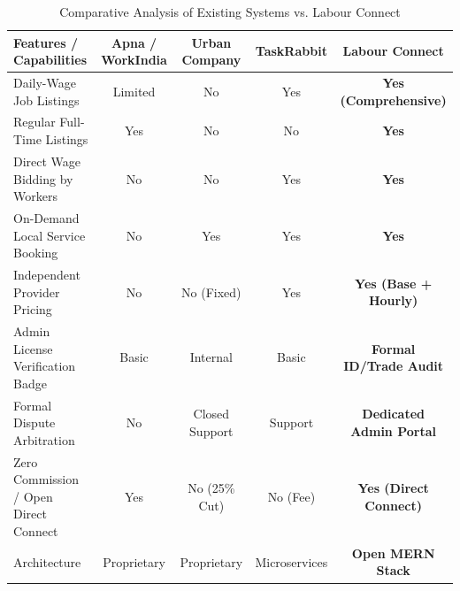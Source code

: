\begin{table}[h!]
\centering
\caption{Comparative Analysis of Existing Systems vs. Labour Connect}\label{tab:lit_comparison}
\begin{tabular}{|l|c|c|c|c|}
\hline
\textbf{Features / Capabilities} & \textbf{Apna / WorkIndia} & \textbf{Urban Company} & \textbf{TaskRabbit} & \textbf{Labour Connect} \\ \hline
Daily-Wage Job Listings & Limited & No & Yes & \textbf{Yes (Comprehensive)} \\ \hline
Regular Full-Time Listings & Yes & No & No & \textbf{Yes} \\ \hline
Direct Wage Bidding by Workers & No & No & Yes & \textbf{Yes} \\ \hline
On-Demand Local Service Booking & No & Yes & Yes & \textbf{Yes} \\ \hline
Independent Provider Pricing & No & No (Fixed) & Yes & \textbf{Yes (Base + Hourly)} \\ \hline
Admin License Verification Badge & Basic & Internal & Basic & \textbf{Formal ID/Trade Audit} \\ \hline
Formal Dispute Arbitration & No & Closed Support & Support & \textbf{Dedicated Admin Portal} \\ \hline
Zero Commission / Open Direct Connect & Yes & No (25\% Cut) & No (Fee) & \textbf{Yes (Direct Connect)} \\ \hline
Architecture & Proprietary & Proprietary & Microservices & \textbf{Open MERN Stack} \\ \hline
\end{tabular}
\end{table}

